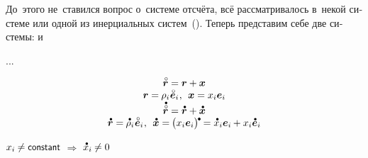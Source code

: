 

\label{section:mechanicsofrelativemotion}

\begin{otherlanguage}{russian}

До~этого
не~ставился
вопрос
о~системе отсчёта,
всё рассматривалось
в~некой  системе
или одной из инерциальных систем~().
Теперь представим себе две системы:
 и~

...

\begin{equation*}
\begin{array}{c}
\initiallocationvector = \locationvector + \bm{x}
\\
\locationvector = \hspace{-0.1ex} \rho_i \hspace{.1ex} \mathcircabove{\bm{e}}_i
\hspace{.1ex} , \:\:
\bm{x} = x_i \bm{e}_i
\\
\mathdotabove{\initiallocationvector} = \mathdotabove{\locationvector} + \mathdotabove{\bm{x}}
\\
\mathdotabove{\locationvector} = \hspace{-0.1ex}
\mathdotabove{\rho}_i \hspace{.1ex} \mathcircabove{\bm{e}}_i
\hspace{.1ex} , \:\:
\mathdotabove{\bm{x}} = \hspace{-0.15ex} \bigl( x_i \bm{e}_i \bigr)^{\hspace{-0.15ex}\tikz[baseline=-0.2ex]\draw[black, fill=black] (0,0) circle (.28ex);} \hspace{-0.15ex}
= \mathdotabove{x}_i \bm{e}_i \hspace{-0.1ex} + x_i \mathdotabove{\bm{e}}_i
\end{array}
\end{equation*}

${x_i \hspace{-0.1ex} \neq \constant}$ $\Rightarrow$ ${\mathdotabove{x}_i \hspace{-0.1ex} \neq 0}$


\end{otherlanguage}
